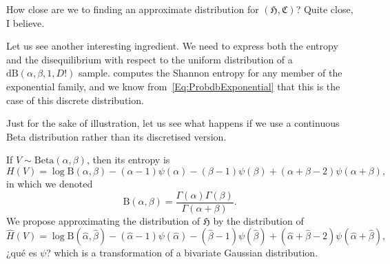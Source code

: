 \documentclass[12pt]{article}
\begin{document}
	How close are we to finding an approximate distribution for $
	(,)$?
	Quite close, I believe.
	
	Let us see another interesting ingredient.
	We need to express both the entropy and the disequilibrium with respect to the uniform distribution of a $(\alpha,\beta,1,D!)$ sample.
	\citet{ShannonsEntropyinExponentialFamiliesStatisticalApplications} computes the Shannon entropy for any member of the exponential family, and we know from~\eqref{Eq:ProbdbExponential} that this is the case of this discrete distribution.
	
	Just for the sake of illustration, let us see what happens if we use a continuous Beta distribution rather than its discretised version.
	
	If $V\sim{}(\alpha,\beta)$, then its entropy is
	\begin{equation}
		H(V) = \log\text{B}(\alpha,\beta) -
		(\alpha-1)\psi(\alpha) -(\beta-1) \psi(\beta) +(\alpha+\beta-2) \psi(\alpha+\beta),
		\label{Eq:HBeta}
	\end{equation}
	in which we denoted
	$$
	\text{B}(\alpha,\beta) = \frac{\Gamma(\alpha)\Gamma(\beta)}{\Gamma(\alpha+\beta)}.
	$$
	We propose approximating the distribution of $$ by the distribution of 
	\begin{equation}
		\widehat{H}(V)= \log\text{B}(\widehat\alpha,\widehat\beta) -
		(\widehat\alpha-1)\psi(\widehat\alpha) -(\widehat\beta-1) \psi(\widehat\beta) +(\widehat\alpha+\widehat\beta-2) \psi(\widehat\alpha+\widehat\beta),
		\label{eq:Hhat}
	\end{equation}
	{\color{magenta} ¿qué es $\psi$? }
	which is a transformation of a bivariate Gaussian distribution.
	
\end{document}
